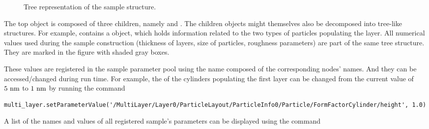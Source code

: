 \begin{figure}[p!]
\caption{Tree representation of the sample structure.}
\label{fig:sample_tree}
\end{figure}


The top  object is composed of three children, namely
 and . The
children objects might themselves also be decomposed into tree-like structures. For example,
 contains a  object, which holds information
related to the two types of particles populating the layer. All numerical values used
during the sample construction (thickness of layers, size of particles, roughness parameters) are part of the same tree structure. 
They are marked in the figure with shaded gray boxes.

These values are registered in the sample parameter pool using the name
composed of the corresponding nodes' names. And they can be accessed/changed
during run time. For example, the  of the cylinders
populating the first layer can be changed from the
current value of $5~\rm{nm}$ to $1~\rm{nm}$ by running the command

\begin{lstlisting}[language=shell, style=commandline]
multi_layer.setParameterValue('/MultiLayer/Layer0/ParticleLayout/ParticleInfo0/Particle/FormFactorCylinder/height', 1.0)
\end{lstlisting}


A list of the names and values of all registered sample's parameters
can be displayed using the command 

